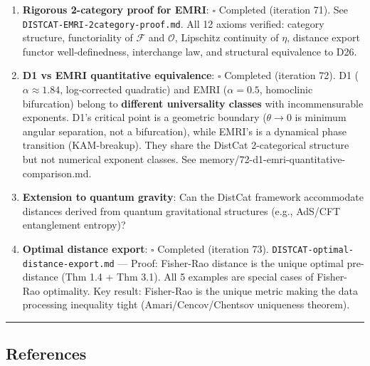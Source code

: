 \documentclass[
]{article}
\providecommand{\tightlist}{%
  \setlength{\itemsep}{0pt}\setlength{\parskip}{0pt}}
\begin{document}
\begin{enumerate}
\def\labelenumi{\arabic{enumi}.}
\tightlist
\item
  \textbf{Rigorous 2-category proof for EMRI}: \(\square\) Completed
  (iteration 71). See \texttt{DISTCAT-EMRI-2category-proof.md}. All 12
  axioms verified: category structure, functoriality of \(\mathcal{F}\)
  and \(\mathcal{O}\), Lipschitz continuity of \(\eta\), distance export
  functor well-definedness, interchange law, and structural equivalence
  to D26.
\item
  \textbf{D1 vs EMRI quantitative equivalence}: \(\square\) Completed
  (iteration 72). D1 (\(\alpha \approx 1.84\), log-corrected quadratic) and EMRI (\(\alpha = 0.5\),
  homoclinic bifurcation) belong to \textbf{different universality
  classes} with incommensurable exponents. D1's critical point is a
  geometric boundary (\(\theta \to 0\) is minimum angular separation, not a
  bifurcation), while EMRI's is a dynamical phase transition
  (KAM-breakup). They share the DistCat 2-categorical structure but not
  numerical exponent classes. See
  memory/72-d1-emri-quantitative-comparison.md.
\item
  \textbf{Extension to quantum gravity}: Can the DistCat framework
  accommodate distances derived from quantum gravitational structures
  (e.g., AdS/CFT entanglement entropy)?
\item
  \textbf{Optimal distance export}: \(\square\) Completed (iteration
  73). \texttt{DISTCAT-optimal-distance-export.md} --- Proof: Fisher-Rao
  distance is the unique optimal pre-distance (Thm 1.4 + Thm 3.1). All
  5 examples are special cases of Fisher-Rao optimality. Key result:
  Fisher-Rao
  is the unique metric making the data processing inequality tight
  (Amari/Cencov/Chentsov uniqueness theorem).
\end{enumerate}

\begin{center}\rule{0.5\linewidth}{0.5pt}\end{center}

\subsection{References}\label{references}
\end{document}
